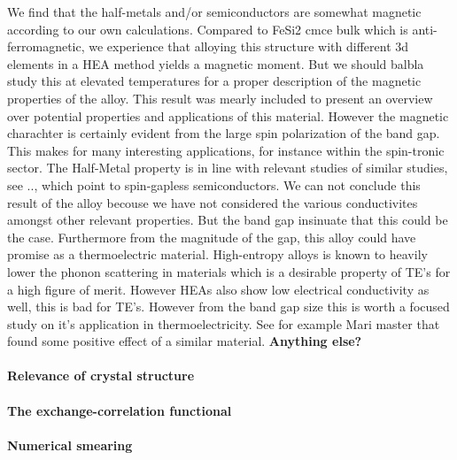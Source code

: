  We find that the half-metals and/or semiconductors are somewhat magnetic according to our own calculations. Compared to FeSi2 cmce bulk which is anti-ferromagnetic, we experience that alloying this structure with different 3d elements in a HEA method yields a magnetic moment.  But we should balbla study this at elevated temperatures for a proper description of the magnetic properties of the alloy. This result was mearly included to present an overview over potential properties and applications of this material. However the magnetic charachter is certainly evident from the large spin polarization of the band gap. This makes for many interesting applications, for instance within the spin-tronic sector. The Half-Metal property is in line with relevant studies of similar studies, see .., which point to spin-gapless semiconductors. We can not conclude this result of the alloy becouse we have not considered the various conductivites amongst other relevant properties. But the band gap insinuate that this could be the case. Furthermore from the magnitude of the gap, this alloy could have promise as a thermoelectric material. High-entropy alloys is known to heavily lower the phonon scattering in materials which is a desirable property of TE's for a high figure of merit. However HEAs also show low electrical conductivity as well, this is bad for TE's. However from the band gap size this is worth a focused study on it's application in thermoelectricity. See for example Mari master that found some positive effect of a similar material. \textbf{Anything else?}


\paragraph{Relevance of crystal structure \\}

\paragraph{The exchange-correlation functional \\}

\paragraph{Numerical smearing \\}

